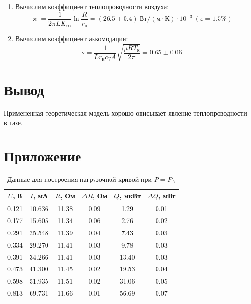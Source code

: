 \documentclass[12pt]{article}
\begin{document}
\begin{enumerate}
            \item Вычислим коэффициент теплопроводности воздуха:
            $$
            \varkappa = \frac{1}{2\pi LK_{\infty}}\ln{\frac{R}{r_{\text{н}}}} = (26.5\pm0.4)\ \text{Вт}/(\text{м}\cdot\text{К})\cdot10^{-3} \ (\varepsilon = 1.5\%)
            $$

            \item Вычислим коэффициент аккомодации:
            $$
            s = \frac{1}{Lr_{\text{н}}c_VA}\sqrt{\frac{\mu RT_{\text{к}}}{2\pi}} = 0.65\pm0.06
            $$

        \end{enumerate}
    \section{Вывод}
    Примененная теоретическая модель хорошо описывает явление теплопроводности в газе.

    \section{Приложение}
    \begin{table}[h]
        \centering
        \caption{Данные для построения нагрузочной кривой при $P = P_A$}
        \begin{tabular}{|c|c|c|c|c|c|}
        \hline
            $U$, В &  $I$, мА &     $R$, Ом & $\Delta R$, Ом &     $Q$, мкВт & $\Delta Q$, мВт \\ \hline
        0.121 & 10.636 & 11.38 &           0.09 &  1.29 &            0.01 \\ \hline
        0.177 & 15.605 & 11.34 &           0.06 &  2.76 &            0.02 \\ \hline
        0.291 & 25.548 & 11.39 &           0.04 &  7.43 &            0.03 \\ \hline
        0.334 & 29.270 & 11.41 &           0.03 &  9.78 &            0.03 \\ \hline
        0.391 & 34.266 & 11.41 &           0.03 & 13.40 &            0.03 \\ \hline
        0.473 & 41.300 & 11.45 &           0.02 & 19.53 &            0.04 \\ \hline
        0.598 & 51.935 & 11.51 &           0.02 & 31.06 &            0.05 \\ \hline
        0.813 & 69.731 & 11.66 &           0.01 & 56.69 &            0.07 \\ \hline
        \end{tabular}
    \end{table}
\end{document}
